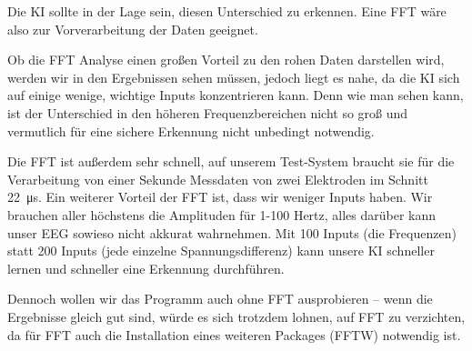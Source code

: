 \documentclass[11pt]{scrartcl}
\begin{document}
	Die KI sollte in der Lage sein, diesen Unterschied zu erkennen. Eine FFT wäre also zur Vorverarbeitung der Daten geeignet.


	\begin{figure}[H]
	\end{figure}
	
	Ob die FFT Analyse einen großen Vorteil zu den rohen Daten darstellen wird, werden wir in den Ergebnissen sehen müssen, jedoch liegt es nahe, da die KI sich auf einige wenige, wichtige Inputs konzentrieren kann. Denn wie man sehen kann, ist der Unterschied in den höheren Frequenzbereichen nicht so groß und vermutlich für eine sichere Erkennung nicht unbedingt notwendig.

	Die FFT ist außerdem sehr schnell, auf unserem Test-System braucht sie für die Verarbeitung von einer Sekunde Messdaten von zwei Elektroden im Schnitt \qty{22}{\micro\second}. Ein weiterer Vorteil der FFT ist, dass wir weniger Inputs haben. Wir brauchen aller höchstens die Amplituden für 1-100 Hertz, alles darüber kann unser EEG sowieso nicht akkurat wahrnehmen. Mit 100 Inputs (die Frequenzen) statt 200 Inputs (jede einzelne Spannungsdifferenz) kann unsere KI schneller lernen und schneller eine Erkennung durchführen.

	Dennoch wollen wir das Programm auch ohne FFT ausprobieren -- wenn die Ergebnisse gleich gut sind, würde es sich trotzdem lohnen, auf FFT zu verzichten, da für FFT auch die Installation eines weiteren Packages (FFTW) notwendig ist. 
\end{document}
